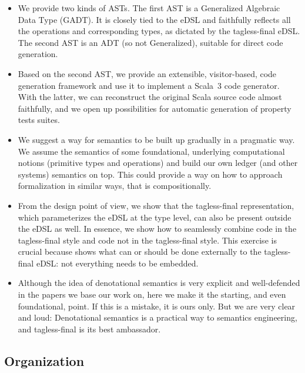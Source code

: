 \documentclass[11pt]{article}
\begin{document}
\begin{itemize}
  \item We provide two kinds of ASTs. The first AST is a Generalized 
  Algebraic Data Type (GADT). It is closely tied to the eDSL and faithfully 
  reflects all the operations and corresponding types, as dictated by the 
  tagless-final eDSL. The second AST is an ADT (so not Generalized), suitable 
  for direct code generation.
  
  \item Based on the second AST, we provide an extensible, visitor-based, 
  code generation framework and use it to implement a Scala~3 code generator. 
  With the latter, we can reconstruct the original Scala source code almost 
  faithfully, and we open up possibilities for automatic generation of 
  property tests suites.

  \item We suggest a way for semantics to be built up gradually in a 
  pragmatic way. We assume the semantics of some foundational, underlying 
  computational notions (primitive types and operations) and build our own 
  ledger (and other systems) semantics on top. This could provide a way on 
  how to approach formalization in similar ways, that is compositionally.

  \item From the design point of view, we show that the tagless-final 
  representation, which parameterizes the eDSL at the type level, can also be 
  present outside the eDSL as well. In essence, we show how to seamlessly 
  combine code in the tagless-final style and code not in the tagless-final 
  style. This exercise is crucial because shows what can or should be done 
  externally to the tagless-final eDSL: not everything needs to be embedded.

  \item Although the idea of denotational semantics is very explicit and 
  well-defended in the papers we base our work on, here we make it the 
  starting, and even foundational, point. If this is a mistake, it is ours 
  only. But we are very clear and loud: Denotational semantics is a practical 
  way to semantics engineering, and tagless-final is its best ambassador.
\end{itemize}

\subsection{Organization}
\end{document}
